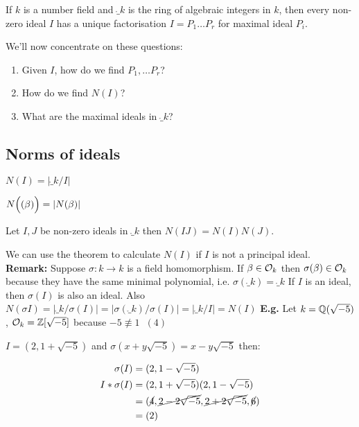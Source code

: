 \documentclass[11pt]{article}
\begin{document}
\begin{theorem}
If $k$ is a number field and $\ring_k$ is the ring of algebraic integers in $k$, then every non-zero ideal $I$ has a unique factorisation $I = P_1 \dots P_r$ for maximal ideal $P_i$.
\end{theorem}
\spa
We'll now concentrate on these questions:
\begin{enumerate}
	\item{Given $I$, how do we find $P_1, \dots P_r$?}
	\item{How do we find $N(I)$?}
	\item{What are the maximal ideals in $\ring_k$?}
\end{enumerate}

\subsection{Norms of ideals}

\begin{defn}
	$N(I) = |\ring_k/I|$

	$N\Big( (\beta)\Big) = |N(\beta)|$
\end{defn}

\begin{theorem}
	Let $I, J$ be non-zero ideals in $\ring_k$ then $N(IJ) = N(I)N(J)$.
\end{theorem}
\spa
We can use the theorem to calculate $N(I)$ if $I$ is not a principal ideal.
\spac
\textbf{Remark:} Suppose $\sigma: k \rightarrow k$ is a field homomorphism.
\spac
If $\beta \in \mathcal{O}_k$ then $\sigma(\beta) \in \mathcal{O}_k$ because they have the same minimal polynomial, i.e. $\sigma(\ring_k) = \ring_k$
\spac
If $I$ is an ideal, then $\sigma(I)$ is also an ideal.
\spac 
Also $N(\sigma I) = |\ring_k /\sigma(I) | = |\sigma(\ring_k) /\sigma(I)| = |\ring_k / I| = N(I)$ 
\spac
\textbf{E.g.} Let $k = \mathbb{Q}(\sqrt{-5})$, $\mathcal{O}_k = \mathbb{Z}[\sqrt{-5}]$ because $-5 \not \equiv 1 \hspace{7pt} (4) $
\spa

$I = (2, 1+\sqrt{-5})$ and $\sigma(x+y\sqrt{-5}) = x-y\sqrt{-5}$ then:

\begin{align*}
	\sigma(I) &= (2, 1-\sqrt{-5})\\
	I* \sigma(I) &= (2, 1+\sqrt{-5} ) (2, 1-\sqrt{-5}) \\
	& = (\cancel{4},\cancel{2 - 2\sqrt{-5}} , \cancel{2+2\sqrt{-5}}, \cancel{6} )\\
	& = (2)
\end{align*}
\end{document}
